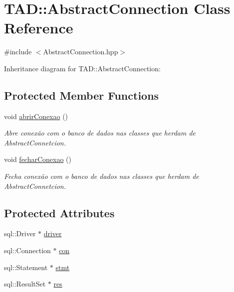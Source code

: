 \hypertarget{class_t_a_d_1_1_abstract_connection}{}\section{T\+AD\+:\+:Abstract\+Connection Class Reference}
\label{class_t_a_d_1_1_abstract_connection}


{\ttfamily \#include $<$Abstract\+Connection.\+hpp$>$}



Inheritance diagram for T\+AD\+:\+:Abstract\+Connection\+:
\subsection*{Protected Member Functions}
\begin{DoxyCompactItemize}
\item 
void \hyperlink{class_t_a_d_1_1_abstract_connection_ad51e1c12d8a32f9c5680f31414a85509}{abrir\+Conexao} ()
\begin{DoxyCompactList}\small\item\em Abre conexão com o banco de dados nas classes que herdam de Abstract\+Connetcion. \end{DoxyCompactList}\item 
void \hyperlink{class_t_a_d_1_1_abstract_connection_a8a4d1b2d6f8d9d279cc98aacdf698072}{fechar\+Conexao} ()
\begin{DoxyCompactList}\small\item\em Fecha conexão com o banco de dados nas classes que herdam de Abstract\+Connetcion. \end{DoxyCompactList}\end{DoxyCompactItemize}
\subsection*{Protected Attributes}
\begin{DoxyCompactItemize}
\item 
sql\+::\+Driver $\ast$ \hyperlink{class_t_a_d_1_1_abstract_connection_a6cee5b6304e40ee9b2596d7d6c6bb786}{driver}
\item 
sql\+::\+Connection $\ast$ \hyperlink{class_t_a_d_1_1_abstract_connection_a2992d6ff49d999a3c002e6ad27f62056}{con}
\item 
sql\+::\+Statement $\ast$ \hyperlink{class_t_a_d_1_1_abstract_connection_a7e9350632ecf5d6005013bdcf6123b60}{stmt}
\item 
sql\+::\+Result\+Set $\ast$ \hyperlink{class_t_a_d_1_1_abstract_connection_a84aa8a8cc3970269c927fb1922977898}{res}
\end{DoxyCompactItemize}



